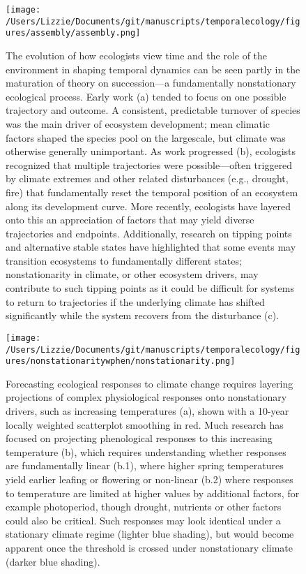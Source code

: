 \documentclass[11pt,a4paper,oneside]{article}
\begin{document}
\newpage
\begin{figure}[h!]
\centering
\noindent \texttt{[image: /Users/Lizzie/Documents/git/manuscripts/temporalecology/figures/assembly/assembly.png]}
\caption{The evolution of how ecologists view time and the role of the environment in shaping temporal dynamics can be seen partly in the maturation of theory on succession---a fundamentally nonstationary ecological process. Early work (a) tended to focus on one possible trajectory and outcome. A consistent, predictable turnover of species was the main driver of ecosystem development; mean climatic factors shaped the species pool on the largescale, but climate was otherwise generally unimportant. As work progressed (b), ecologists recognized that multiple trajectories were possible---often triggered by climate extremes and other related disturbances (e.g., drought, fire) that fundamentally reset the temporal position of an ecosystem along its development curve. More recently, ecologists have layered onto this an appreciation of factors that may yield diverse trajectories and endpoints. Additionally, research on tipping points and alternative stable states have highlighted that some events may transition ecosystems to fundamentally different states; nonstationarity in climate, or other ecosystem drivers, may contribute to such tipping points as it could be difficult for systems to return to trajectories if the underlying climate has shifted significantly while the system recovers from the disturbance (c).}
\end{figure}

\newpage
\begin{figure}[h!]
\centering
\noindent \texttt{[image: /Users/Lizzie/Documents/git/manuscripts/temporalecology/figures/nonstationaritywphen/nonstationarity.png]}
\caption{Forecasting ecological responses to climate change requires layering projections of complex physiological responses onto nonstationary drivers, such as increasing temperatures (a), shown with a 10-year locally weighted scatterplot smoothing in red. Much research has focused on projecting phenological responses to this increasing temperature (b), which requires understanding whether responses are fundamentally linear (b.1), where higher spring temperatures yield earlier leafing or flowering or non-linear (b.2) where responses to temperature are limited at higher values by additional factors, for example photoperiod, though drought, nutrients or other factors could also be critical. Such responses may look identical under a stationary climate regime (lighter blue shading), but would become apparent once the threshold is crossed under nonstationary climate (darker blue shading).}
\end{figure}
\end{document}
